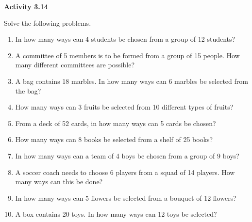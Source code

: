 \vspace{0.3ex}
\noindent\textbf{Activity 3.14}

\vspace{0.2ex}

Solve the following problems.

\begin{enumerate}[label=\color{blue}\arabic*.]
    \item In how many ways can 4 students be chosen from a group of 12 students?
    \item A committee of 5 members is to be formed from a group of 15 people. How many different committees are possible?
    \item A bag contains 18 marbles. In how many ways can 6 marbles be selected from the bag?
    \item How many ways can 3 fruits be selected from 10 different types of fruits?
    \item From a deck of 52 cards, in how many ways can 5 cards be chosen?
    \item How many ways can 8 books be selected from a shelf of 25 books?
    \item In how many ways can a team of 4 boys be chosen from a group of 9 boys?
    \item A soccer coach needs to choose 6 players from a squad of 14 players. How many ways can this be done?
    \item In how many ways can 5 flowers be selected from a bouquet of 12 flowers?
    \item A box contains 20 toys. In how many ways can 12 toys be selected?
\end{enumerate}
